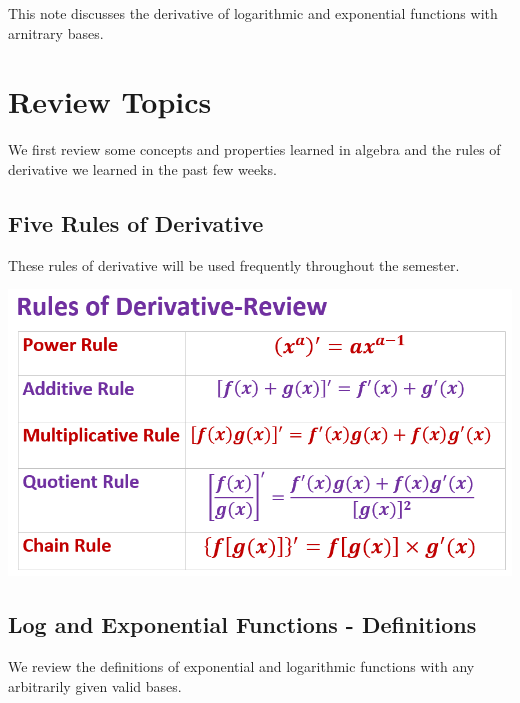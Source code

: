 \documentclass[
]{book}
\begin{document}
This note discusses the derivative of logarithmic and exponential functions with arnitrary bases.

\hypertarget{review-topics-1}{%
\section{Review Topics}\label{review-topics-1}}

We first review some concepts and properties learned in algebra and the rules of derivative we learned in the past few weeks.

\hfill\break

\hypertarget{five-rules-of-derivative}{%
\subsection{Five Rules of Derivative}\label{five-rules-of-derivative}}

\hfill\break

These rules of derivative will be used frequently throughout the semester.

\begin{center}\includegraphics[width=0.8\linewidth]{img06/w06-RuelDerivatives} \end{center}

\hfill\break

\hypertarget{log-and-exponential-functions---definitions}{%
\subsection{Log and Exponential Functions - Definitions}\label{log-and-exponential-functions---definitions}}

We review the definitions of exponential and logarithmic functions with any arbitrarily given valid bases.\\
\end{document}

